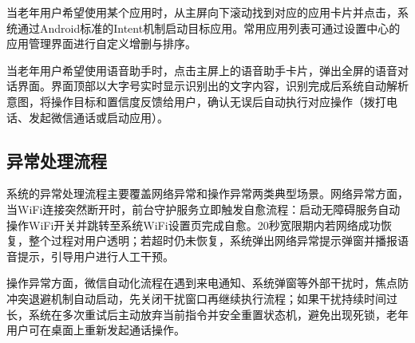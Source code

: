 当老年用户希望使用某个应用时，从主屏向下滚动找到对应的应用卡片并点击，系统通过Android标准的Intent机制启动目标应用。常用应用列表可通过设置中心的应用管理界面进行自定义增删与排序。

当老年用户希望使用语音助手时，点击主屏上的语音助手卡片，弹出全屏的语音对话界面。界面顶部以大字号实时显示识别出的文字内容，识别完成后系统自动解析意图，将操作目标和置信度反馈给用户，确认无误后自动执行对应操作（拨打电话、发起微信通话或启动应用）。

\subsection{异常处理流程}

系统的异常处理流程主要覆盖网络异常和操作异常两类典型场景。网络异常方面，当WiFi连接突然断开时，前台守护服务立即触发自愈流程：启动无障碍服务自动操作WiFi开关并跳转至系统WiFi设置页完成自愈。20秒宽限期内若网络成功恢复，整个过程对用户透明；若超时仍未恢复，系统弹出网络异常提示弹窗并播报语音提示，引导用户进行人工干预。

操作异常方面，微信自动化流程在遇到来电通知、系统弹窗等外部干扰时，焦点防冲突退避机制自动启动，先关闭干扰窗口再继续执行流程；如果干扰持续时间过长，系统在多次重试后主动放弃当前指令并安全重置状态机，避免出现死锁，老年用户可在桌面上重新发起通话操作。

